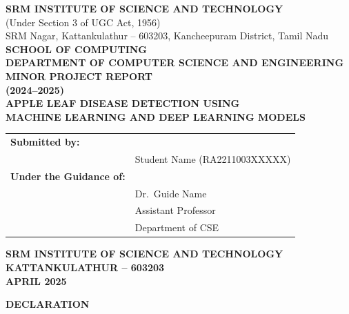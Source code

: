 \documentclass[12pt]{report}
\begin{document}
\begin{titlepage}
\begin{center}

\vspace*{0.5cm}

\textbf{\large SRM INSTITUTE OF SCIENCE AND TECHNOLOGY}\\
(Under Section 3 of UGC Act, 1956)\\[0.3cm]
SRM Nagar, Kattankulathur -- 603203, Kancheepuram District, Tamil Nadu\\[1cm]

\textbf{\large SCHOOL OF COMPUTING}\\
\textbf{DEPARTMENT OF COMPUTER SCIENCE AND ENGINEERING}\\[1.5cm]

\textbf{\Large MINOR PROJECT REPORT}\\[0.5cm]
\textbf{(2024--2025)}\\[1.5cm]

\textbf{\LARGE APPLE LEAF DISEASE DETECTION USING\\MACHINE LEARNING AND DEEP LEARNING MODELS}\\[2cm]

\begin{tabular}{ll}
\textbf{Submitted by:} & \\
& Student Name (RA2211003XXXXX) \\[0.5cm]
\textbf{Under the Guidance of:} & \\
& Dr.\ Guide Name \\
& Assistant Professor \\
& Department of CSE \\
\end{tabular}

\vfill

\textbf{SRM INSTITUTE OF SCIENCE AND TECHNOLOGY}\\
\textbf{KATTANKULATHUR -- 603203}\\[0.3cm]
\textbf{APRIL 2025}

\end{center}
\end{titlepage}

\newpage
\thispagestyle{fancy}
\begin{center}
\textbf{\large DECLARATION}
\end{center}
\vspace{1cm}
\end{document}
